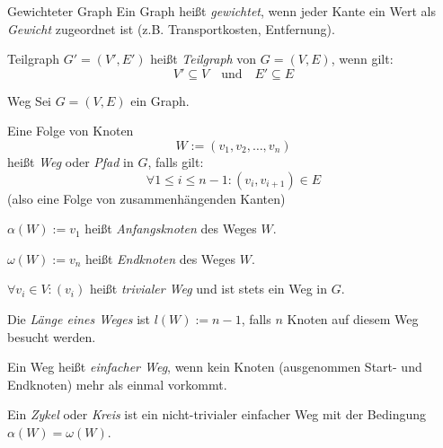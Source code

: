 \begin{defi}{Gewichteter Graph}
    Ein Graph heißt \emph{gewichtet}, wenn jeder Kante ein Wert als \emph{Gewicht} zugeordnet ist (z.B. Transportkosten, Entfernung).

    \begin{center}
    \end{center}
\end{defi}

\begin{defi}{Teilgraph}
    $G' = (V', E')$ heißt \emph{Teilgraph} von $G=(V, E)$, wenn gilt:
    $$
        V' \subseteq V \quad \text{und} \quad E' \subseteq E
    $$
\end{defi}

\begin{defi}{Weg}
    Sei $G = (V, E)$ ein Graph.

    Eine Folge von Knoten
    $$
        W := (v_1, v_2, \ldots, v_n)
    $$
    heißt \emph{Weg} oder \emph{Pfad} in $G$, falls gilt:
    $$
        \forall 1 \leq i \leq n-1 : (v_i, v_{i+1}) \in E
    $$
    (also eine Folge von zusammenhängenden Kanten)

    $\alpha(W) := v_1$ heißt \emph{Anfangsknoten} des Weges $W$.

    $\omega(W) := v_n$ heißt \emph{Endknoten} des Weges $W$.

    $\forall v_i \in V : (v_i)$ heißt \emph{trivialer Weg} und ist stets ein Weg in $G$.

    Die \emph{Länge eines Weges} ist $l(W) := n-1$, falls $n$ Knoten auf diesem Weg besucht werden.

    Ein Weg heißt \emph{einfacher Weg}, wenn kein Knoten (ausgenommen Start- und Endknoten) mehr als einmal vorkommt.

    Ein \emph{Zykel} oder \emph{Kreis} ist ein nicht-trivialer einfacher Weg mit der Bedingung $\alpha(W) = \omega(W)$.
\end{defi}

